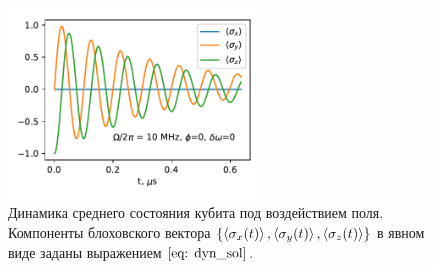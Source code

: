 \begin{figure}[t]
	\centering
	\includegraphics[width=0.6\textwidth]{images/Rabi_res.pdf}
	\caption[Динамика состояния кубита под действием внешнего поля в случае резонанса]{Динамика среднего состояния кубита под воздействием поля. Компоненты блоховского вектора $\{\braket{\sigma_x(t)}, \braket{\sigma_y(t)}, \braket{\sigma_z(t)}\}$ в явном виде заданы выражением $\eqref{eq: dyn_sol}$.}
	\label{img: Rabi_dyn_res}
\end{figure}

